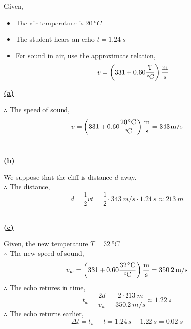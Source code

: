 \documentclass{article}
\begin{document}
Given,
\begin{itemize}
    \item The air temperature is $\qty{20}{\degree C}$
    \item The student hears an echo $t=\qty{1.24}{s}$
    \item For sound in air, use the approximate relation,
    $$v= \left( 331+0.60\unit{\frac{T}{\degree C}} \right) \unit{\frac{m}{s}}$$
\end{itemize}
\begin{center}
    {\large \bfseries \color{aquablue!80!blue} \underline{(a)}}
\end{center}
$\therefore$ The speed of sound,
$$v= \left( 331+0.60\unit{\frac{\qty{20}{\degree C}}{\degree C}} \right) \unit{\frac{m}{s}}=\qty{343}{m/s}$$\\
\begin{center}
    {\large \bfseries \color{aquablue!80!blue} \underline{(b)}}
\end{center}
We suppose that the cliff is distance $d$ away.\\
$\therefore$ The distance,
$$d=\frac{1}{2}vt=\frac{1}{2}\cdot\qty{343}{m/s}\cdot \qty{1.24}{s}\approx \qty{213}{m}$$\\
\begin{center}
    {\large \bfseries \color{aquablue!80!blue} \underline{(c)}}
\end{center}
Given, the new temperature $T=\qty{32}{\degree C}$\\
$\therefore$ The new speed of sound,
$$v_w= \left( 331+0.60\unit{\frac{\qty{32}{\degree C}}{\degree C}} \right) \unit{\frac{m}{s}}=\qty{350.2}{m/s}$$
$\therefore$ The echo retures in time,\\
$$t_w=\frac{2d}{v_w}=\frac{2\cdot \qty{213}{m}}{\qty{350.2}{m/s}}\approx \qty{1.22}{s}$$
$\therefore$ The echo returns earlier,
$$\Delta t =t_w-t=\qty{1.24}{s}-\qty{1.22}{s}=\qty{0.02}{s}$$\\
\end{document}
